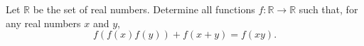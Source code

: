 Let $\mathbb{R}$ be the set of real numbers. Determine all functions $f: \mathbb{R} \rightarrow \mathbb{R}$ such that, for any real numbers $x$ and $y$, \[ f(f(x)f(y)) + f(x+y) = f(xy). \]
